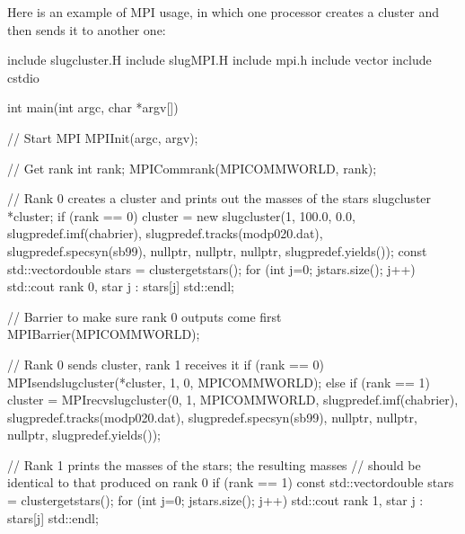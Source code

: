 \documentclass[letterpaper,10pt,english]{sphinxmanual}
\begin{document}
Here is an example of MPI usage, in which one processor creates a
cluster and then sends it to another one:

\begin{sphinxVerbatim}[commandchars=\\\{\}]
\PYGZsh{}include \PYGZdq{}slug\PYGZus{}cluster.H\PYGZdq{}
\PYGZsh{}include \PYGZdq{}slug\PYGZus{}MPI.H\PYGZdq{}
\PYGZsh{}include \PYGZdq{}mpi.h\PYGZdq{}
\PYGZsh{}include \PYGZlt{}vector\PYGZgt{}
\PYGZsh{}include \PYGZlt{}cstdio\PYGZgt{}

int main(int argc, char *argv[]) \PYGZob{}

  // Start MPI
  MPI\PYGZus{}Init(\PYGZam{}argc, \PYGZam{}argv);

  // Get rank
  int rank;
  MPI\PYGZus{}Comm\PYGZus{}rank(MPI\PYGZus{}COMM\PYGZus{}WORLD, \PYGZam{}rank);

  // Rank 0 creates a cluster and prints out the masses of the stars
  slug\PYGZus{}cluster *cluster;
  if (rank == 0) \PYGZob{}
    cluster =
       new slug\PYGZus{}cluster(1, 100.0, 0.0, slug\PYGZus{}predef.imf(\PYGZdq{}chabrier\PYGZdq{}),
                        slug\PYGZus{}predef.tracks(\PYGZdq{}modp020.dat\PYGZdq{}),
                        slug\PYGZus{}predef.specsyn(\PYGZdq{}sb99\PYGZdq{}),
                        nullptr, nullptr, nullptr,
                        slug\PYGZus{}predef.yields());
    const std::vector\PYGZlt{}double\PYGZgt{} stars = cluster\PYGZhy{}\PYGZgt{}get\PYGZus{}stars();
    for (int j=0; j\PYGZlt{}stars.size(); j++)
      std::cout \PYGZlt{}\PYGZlt{} \PYGZdq{}rank 0, star \PYGZdq{} \PYGZlt{}\PYGZlt{} j
                \PYGZlt{}\PYGZlt{} \PYGZdq{}: \PYGZdq{} \PYGZlt{}\PYGZlt{} stars[j] \PYGZlt{}\PYGZlt{} std::endl;
  \PYGZcb{}

  // Barrier to make sure rank 0 outputs come first
  MPI\PYGZus{}Barrier(MPI\PYGZus{}COMM\PYGZus{}WORLD);

  // Rank 0 sends cluster, rank 1 receives it
  if (rank == 0) \PYGZob{}
    MPI\PYGZus{}send\PYGZus{}slug\PYGZus{}cluster(*cluster, 1, 0, MPI\PYGZus{}COMM\PYGZus{}WORLD);
  \PYGZcb{} else if (rank == 1) \PYGZob{}
    cluster = MPI\PYGZus{}recv\PYGZus{}slug\PYGZus{}cluster(0, 1, MPI\PYGZus{}COMM\PYGZus{}WORLD,
                                    slug\PYGZus{}predef.imf(\PYGZdq{}chabrier\PYGZdq{}),
                                    slug\PYGZus{}predef.tracks(\PYGZdq{}modp020.dat\PYGZdq{}),
                                    slug\PYGZus{}predef.specsyn(\PYGZdq{}sb99\PYGZdq{}),
                                    nullptr, nullptr, nullptr,
                                    slug\PYGZus{}predef.yields());
  \PYGZcb{}

  // Rank 1 prints the masses of the stars; the resulting masses
  // should be identical to that produced on rank 0
  if (rank == 1) \PYGZob{}
    const std::vector\PYGZlt{}double\PYGZgt{} stars = cluster\PYGZhy{}\PYGZgt{}get\PYGZus{}stars();
    for (int j=0; j\PYGZlt{}stars.size(); j++)
      std::cout \PYGZlt{}\PYGZlt{} \PYGZdq{}rank 1, star \PYGZdq{} \PYGZlt{}\PYGZlt{} j
                \PYGZlt{}\PYGZlt{} \PYGZdq{}: \PYGZdq{} \PYGZlt{}\PYGZlt{} stars[j] \PYGZlt{}\PYGZlt{} std::endl;
  \PYGZcb{}
\PYGZcb{}
\end{sphinxVerbatim}
\end{document}
